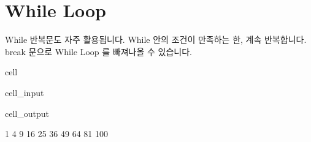 \documentclass[letterpaper,10pt,english]{jupyterBook}
\begin{document}
\part{While Loop}
\label{\detokenize{chapter2/2.1.3_Python_Basics:while-loop}}
\sphinxAtStartPar
While 반복문도 자주 활용됩니다. While 안의 조건이 만족하는 한, 계속 반복합니다. break 문으로 While Loop 를 빠져나올 수 있습니다.

\begin{sphinxuseclass}{cell}\begin{sphinxVerbatimInput}

\begin{sphinxuseclass}{cell_input}
\begin{sphinxVerbatim}[commandchars=\\\{\}]
  
        
       
\end{sphinxVerbatim}

\end{sphinxuseclass}\end{sphinxVerbatimInput}
\begin{sphinxVerbatimOutput}

\begin{sphinxuseclass}{cell_output}
\begin{sphinxVerbatim}[commandchars=\\\{\}]
1
4
9
16
25
36
49
64
81
100
\end{sphinxVerbatim}

\end{sphinxuseclass}\end{sphinxVerbatimOutput}

\end{sphinxuseclass}
\end{document}
